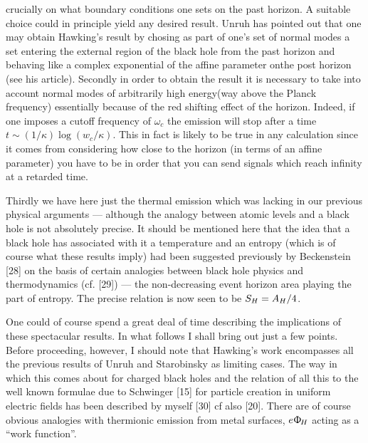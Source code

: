 crucially on what boundary conditions one sets on the past horizon. A suitable choice
could in principle yield any desired result. Unruh has pointed out that one may obtain
Hawking's result by chosing as part of one's set of normal modes a set entering the
external region of the black hole from the past horizon and behaving like a complex
exponential of the affine parameter onthe post horizon (see his article).
Secondly in order to obtain the result it is necessary to take into account normal
modes of arbitrarily high energy(way above the Planck frequency) essentially because
of the red shifting effect of the horizon. Indeed, if one imposes a cutoff frequency
of $\omega_c$ the emission will stop after a time $t \sim (1/\kappa) \log(w_c/\kappa)$.
This in fact is likely to be true in any calculation since it comes from considering
how close to the horizon (in terms of an affine parameter) you have to be in
order that you can send signals which reach infinity at a retarded time.

Thirdly we have here just the thermal emission which was lacking in our previous physical
arguments --- although the analogy between atomic levels and a black hole is not
absolutely precise. It should be mentioned here that the idea that a black hole
has associated with it a temperature and an entropy (which is of course
what these results imply) had been suggested previously by Beckenstein [28]
on the basis of certain analogies between black hole physics and thermodynamics (cf. [29]) --- 
the non-decreasing event horizon area playing the part of entropy. The precise
relation is now seen to be $S_H = A_H/4$.

One could of course spend a great deal of time describing the implications
of these spectacular results. In what follows I shall bring out just a few points.
Before proceeding, however, I should note that Hawking's work encompasses
all the previous results of Unruh and Starobinsky as limiting cases. The way in which
this comes about for charged black holes and the relation of all this to the well
known formulae due to Schwinger [15] for particle creation in uniform electric
fields has been described by myself [30] cf also [20]. There are of course obvious
analogies with thermionic emission from metal surfaces, $e\Upphi_{\!H}$ acting as a
``work function''.

